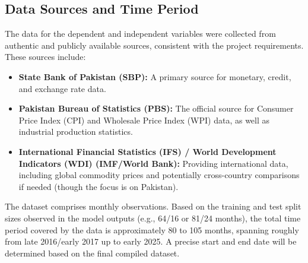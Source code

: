 \documentclass[12pt,a4paper]{article}
\begin{document}
\subsection{Data Sources and Time Period}
The data for the dependent and independent variables were collected from authentic and publicly available sources, consistent with the project requirements. These sources include:
\begin{itemize}
    \item \textbf{State Bank of Pakistan (SBP):} A primary source for monetary, credit, and exchange rate data.
    \item \textbf{Pakistan Bureau of Statistics (PBS):} The official source for Consumer Price Index (CPI) and Wholesale Price Index (WPI) data, as well as industrial production statistics.
    \item \textbf{International Financial Statistics (IFS) / World Development Indicators (WDI) (IMF/World Bank):} Providing international data, including global commodity prices and potentially cross-country comparisons if needed (though the focus is on Pakistan).
\end{itemize}
The dataset comprises monthly observations. Based on the training and test split sizes observed in the model outputs (e.g., 64/16 or 81/24 months), the total time period covered by the data is approximately 80 to 105 months, spanning roughly from late 2016/early 2017 up to early 2025. A precise start and end date will be determined based on the final compiled dataset.
\end{document}
